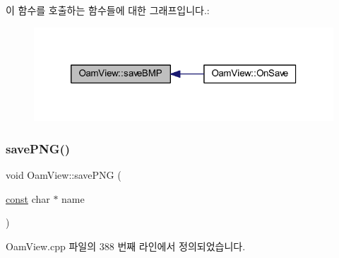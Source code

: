 이 함수를 호출하는 함수들에 대한 그래프입니다.\+:
\nopagebreak
\begin{figure}[H]
\begin{center}
\leavevmode
\includegraphics[width=320pt]{class_oam_view_aa760ae67c006a164258c21a127e1e847_icgraph}
\end{center}
\end{figure}
\mbox{\label{class_oam_view_ac5531c409060efd6ef1654ae908db4ef}} 
\subsubsection{\texorpdfstring{save\+P\+N\+G()}{savePNG()}}
{\footnotesize\ttfamily void Oam\+View\+::save\+P\+NG (\begin{DoxyParamCaption}\item[{\mbox{\hyperlink{getopt1_8c_a2c212835823e3c54a8ab6d95c652660e}{const}} char $\ast$}]{name }\end{DoxyParamCaption})}



Oam\+View.\+cpp 파일의 388 번째 라인에서 정의되었습니다.


